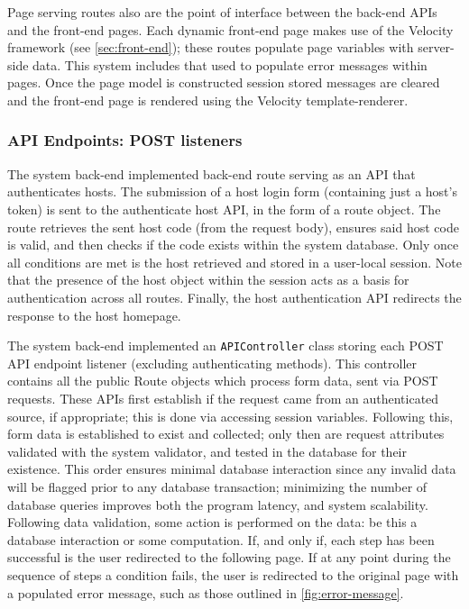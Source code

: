 \documentclass[9pt, titlepage]{extarticle}
\newcounter{subsubsubsection}[subsubsection]
\begin{document}
Page serving routes also are the point of interface between the back-end APIs and the front-end pages. Each dynamic front-end page makes use of the Velocity framework (see \ref{sec:front-end}); these routes populate page variables with server-side data. This system includes that used to populate error messages within pages. Once the page model is constructed session stored messages are cleared and the front-end page is rendered using the Velocity template-renderer. 

\subsubsection{API Endpoints: POST listeners}

The system back-end implemented back-end route serving as an API that authenticates hosts. The submission of a host login form (containing just a host's token) is sent to the authenticate host API, in the form of a route object. The route retrieves the sent host code (from the request body), ensures said host code is valid, and then checks if the code exists within the system database. Only once all conditions are met is the host retrieved and stored in a user-local session. Note that the presence of the host object within the session acts as a basis for authentication across all routes. Finally, the host authentication API redirects the response to the host homepage. 



The system back-end implemented an \texttt{APIController} class storing each POST API endpoint listener (excluding authenticating methods). This controller contains all the public Route objects which process form data, sent via POST requests. These APIs first establish if the request came from an authenticated source, if appropriate; this is done via accessing session variables. Following this, form data is established to exist and collected; only then are request attributes validated with the system validator, and tested in the database for their existence. This order ensures minimal database interaction since any invalid data will be flagged prior to any database transaction; minimizing the number of database queries improves both the program latency, and system scalability. Following data validation, some action is performed on the data: be this a database interaction or some computation. If, and only if, each step has been successful is the user redirected to the following page. If at any point during the sequence of steps a condition fails, the user is redirected to the original page with a populated error message, such as those outlined in \autoref{fig:error-message}. 
\end{document}
